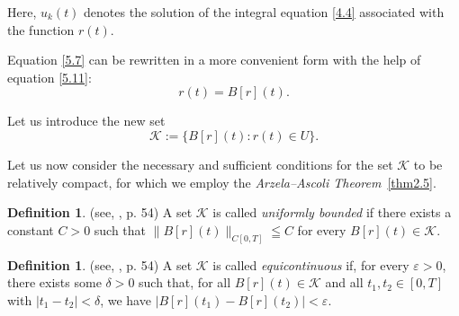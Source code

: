 \documentclass[reqno]{amsart}
\theoremstyle{definition}
\newtheorem{defn}[thm]{Definition}
\numberwithin{equation}{section}
\begin{document}
Here, $u_k(t)$ denotes the solution of the integral equation \eqref{4.4} associated with the function $r(t)$.

Equation \eqref{5.7} can be rewritten in a more convenient form with the help of equation \eqref{5.11}:
\begin{equation}\label{5.12}
  r(t)=B[r](t).  
\end{equation}

Let us introduce the new set
$$
\mathcal{K} := \{ B[r](t) : r(t) \in U \}.
$$

Let us now consider the necessary and sufficient conditions for the set $\mathcal{K}$ to be relatively compact, for which we employ the \textit{Arzela–Ascoli Theorem}~\ref{thm2.5}.

\begin{defn} \label{def5.3} (see, \cite{Kolmogorov}, p. 54) A set $\mathcal{K}$ is called \textit{uniformly bounded} if there exists a constant $C>0$ such that $\|B[r](t)\|_{C[0,T]} \leqq C$ for every $B[r](t) \in \mathcal{K}$.
\end{defn}

\begin{defn} \label{def5.4} (see, \cite{Kolmogorov}, p. 54) A set $\mathcal{K}$ is called \textit{equicontinuous} if, for every $\varepsilon>0$, there exists some $\delta>0$ such that, for all $B[r](t) \in \mathcal{K}$ and all $t_1, t_2 \in[0,T]$ with $\left|t_1-t_2\right|<\delta$, we have $\left|B[r]\left(t_1\right)-B[r]\left(t_2\right)\right|<\varepsilon$.   
\end{defn}
\end{document}

